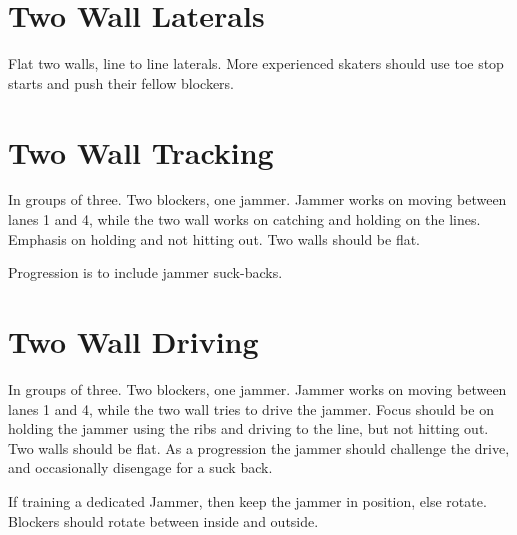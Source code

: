 \documentclass{journal}
\begin{document}




\section*{Two Wall Laterals}
\label{drill:two_wall:laterals}

Flat two walls, line to line laterals.  
More experienced skaters should use toe stop starts and push their fellow blockers.  

\section*{Two Wall Tracking}
\label{drill:two_wall:tracking}
In groups of three. 
Two blockers, one jammer.
Jammer works on moving between lanes 1 and 4, while the two wall works on catching and holding on the lines.
Emphasis on holding and not hitting out.      
Two walls should be flat.

Progression is to include jammer suck-backs.

\section*{Two Wall Driving}
\label{drill:two_wall:driving}
In groups of three. 
Two blockers, one jammer.
Jammer works on moving between lanes 1 and 4, while the two wall tries to drive the jammer.  
Focus should be on holding the jammer using the ribs and driving to the line, but not hitting out. 
Two walls should be flat.
As a progression the jammer should challenge the drive, and occasionally disengage for a suck back.

If training a dedicated Jammer, then keep the jammer in position, else rotate.
Blockers should rotate between inside and outside. 
\end{document}
